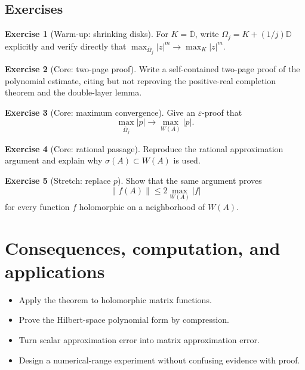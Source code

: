 \documentclass[11pt,oneside,openany]{book}
\theoremstyle{definition}
\newtheorem{exercise}{Exercise}[chapter]
\theoremstyle{remark}
\newcommand{\D}{\mathbb D}
\newcommand{\spec}{\sigma}
\newcommand{\norm}[1]{\left\lVert #1\right\rVert}
\newcommand{\eps}{\varepsilon}
\newcommand{\olD}{\overline{\D}}
\begin{document}
\section{Exercises}

\begin{exercise}[Warm-up: shrinking disks]
For \(K=\olD\), write \(\Omega_j=K+(1/j)\D\) explicitly and verify
directly that
\(\max_{\overline\Omega_j}|z|^m\to\max_K|z|^m\).
\end{exercise}

\begin{exercise}[Core: two-page proof]
\label{ex:two-page-proof}
Write a self-contained two-page proof of the polynomial estimate,
citing but not reproving the positive-real completion theorem and the
double-layer lemma.
\end{exercise}

\begin{exercise}[Core: maximum convergence]
Give an \(\eps\)-proof that
\[
  \max_{\overline\Omega_j}|p|
  \to\max_{W(A)}|p|.
\]
\end{exercise}

\begin{exercise}[Core: rational passage]
\label{ex:rational-passage}
Reproduce the rational approximation argument and explain why
\(\spec(A)\subset W(A)\) is used.
\end{exercise}

\begin{exercise}[Stretch: replace \(p\)]
Show that the same argument proves
\[
  \norm{f(A)}
  \leq2\max_{W(A)}|f|
\]
for every function \(f\) holomorphic on a neighborhood of \(W(A)\).
\end{exercise}

\chapter{Consequences, computation, and applications}
\label{ch:consequences}

\begin{learninggoals}
\begin{itemize}
  \item Apply the theorem to holomorphic matrix functions.
  \item Prove the Hilbert-space polynomial form by compression.
  \item Turn scalar approximation error into matrix approximation error.
  \item Design a numerical-range experiment without confusing evidence
  with proof.
\end{itemize}
\end{learninggoals}
\end{document}
